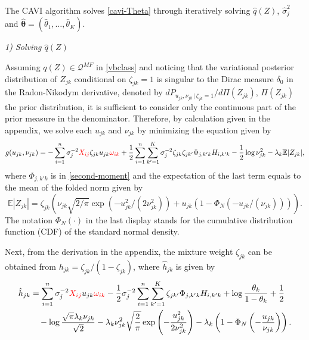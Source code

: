 \documentclass[pdftex]{imsart}
\newcommand{\given}{\,|\,}
\theoremstyle{plain}
\begin{document}
The CAVI algorithm solves \eqref{cavi-Theta} through iteratively solving $\hat q(Z)$, $\hat\sigma_j^2$ and $\hat{\boldsymbol \theta} = (\hat \theta_1, \dots, \hat \theta_K)$. 

{\it 1) Solving $\hat q(Z)$}

Assuming $q(Z) \in \mathcal{Q}^{MF}$ in \eqref{vbclass} and
noticing that the variational posterior distribution of $Z_{jk}$ conditional on $\zeta_{jk} = 1$ is singular to the Dirac measure $\delta_0$ in the Radon-Nikodym derivative, denoted by $dP_{u_{jk}, \nu_{jk} \given \zeta_{jk} = 1}/d\Pi(Z_{jk})$, $\Pi(Z_{jk})$ the prior distribution, it is sufficient to consider only the continuous part of the prior measure in the denominator. 
Therefore, by calculation given in the appendix, we solve each $u_{jk}$ and $\nu_{jk}$ by minimizing the equation given by
\begin{align}
\label{eqn:g}
g(u_{jk}, \nu_{jk}) = - \sum_{i=1}^n \sigma_j^{-2} \textcolor{red}{X_{ij}} \zeta_{jk} u_{jk}\textcolor{red}{\omega_{ik}} + \frac{1}{2} \sum_{i=1}^n \sum_{k' = 1}^K  \sigma_j^{-2}\zeta_{jk} \zeta_{jk'} \Phi_{j, k'k} H_{i, k'k} - \frac{1}{2} \log \nu_{jk}^2 - \lambda_k \mathbb{E}|Z_{jk}|,
\end{align}
where $\Phi_{j, k'k}$ is in \eqref{second-moment} and
the expectation of the last term equals to the mean of the folded norm given by
$$
\mathbb{E}|Z_{jk}| = \zeta_{jk} 
\left(
\nu_{jk} \sqrt{2/\pi} \exp(- u_{jk}^2/(2 \nu_{jk}^2))
+ u_{jk} (1 - \Phi_N(-u_{jk}/(\nu_{jk})))
\right).
$$
The notation $\Phi_N(\cdot)$ in the last display stands for the cumulative distribution function (CDF) of the standard normal density.

Next, from the derivation in the appendix, the mixture weight $\zeta_{jk}$ can be obtained from $h_{jk} = \zeta_{jk}/(1- \zeta_{jk})$, where $\hat h_{jk}$ is given by
\begin{equation}
\begin{split} 
\label{eqn:hjk}
\hat h_{jk} & =
\sum_{i=1}^n \sigma_j^{-2} \textcolor{red}{X_{ij}}u_{jk} \textcolor{red}{\omega_{ik}}
- \frac{1}{2} \sigma_j^{-2} \sum_{i=1}^n \sum_{k' = 1}^K \zeta_{jk'} \Phi_{j, k'k} H_{i, k'k} + \log \frac{\theta_k}{1-\theta_k} 
+ \frac{1}{2}  \\
& \quad - \log \frac{\sqrt{\pi}\lambda_k \nu_{jk}}{\sqrt{2}} - \lambda_k \nu_{jk}^2 \sqrt{\frac{2}{\pi}} \exp\left(- \frac{u_{jk}^2}{2 \nu_{jk}^2} \right) - \lambda_k \left(1 - \Phi_N\left(- \frac{u_{jk}}{\nu_{jk}}\right)\right).
\end{split}
\end{equation}
\end{document}
